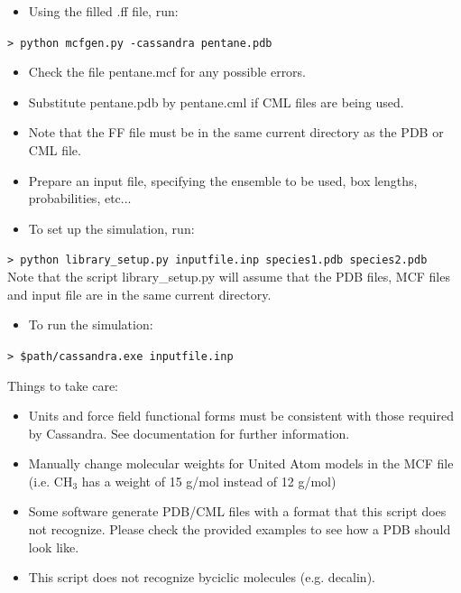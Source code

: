 \documentclass{beamer}
\begin{document}
\begin{frame}
\begin{itemize}
\item Using the filled .ff file, run:
\end{itemize}
\texttt{>  python mcfgen.py -cassandra pentane.pdb}
\begin{itemize}
\item Check the file pentane.mcf for any possible errors.
\item Substitute pentane.pdb by pentane.cml if CML files are being used.
\item Note that the FF file must be in the same current directory as the PDB or CML file.
\end{itemize}
\end{frame}
\begin{frame}
\begin{itemize}
\item Prepare an input file, specifying the ensemble to be used, box lengths, probabilities, etc...
\item To set up the simulation, run:
\end{itemize}
\texttt{> python library\_setup.py inputfile.inp species1.pdb species2.pdb}
\\
Note that the script library\_setup.py will assume that the PDB files, MCF files and input file
are in the same current directory.

\begin{itemize}
\item To run the simulation:
\end{itemize}
\texttt{> \$path/cassandra.exe inputfile.inp}
\end{frame}
\begin{frame}
Things to take care:
\begin{itemize}
\item Units and force field functional forms must be consistent with those required by Cassandra. See documentation for further information.
\item Manually change molecular weights for United Atom models in the MCF file (i.e. CH$_3$ has a weight of 15 g/mol instead of 12 g/mol)
\item Some software generate PDB/CML files with a format that this script does not recognize. Please check the provided examples to see how a PDB should look like.
\item This script does not recognize byciclic molecules (e.g. decalin).
\end{itemize}
\end{frame}
\end{document}
